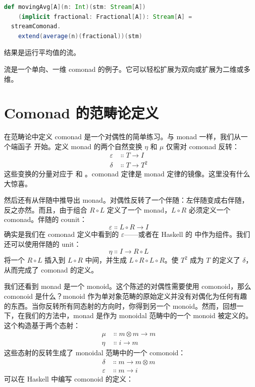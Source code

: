 \begin{lstlisting}[language=Scala]
def movingAvg[A](n: Int)(stm: Stream[A])
    (implicit fractional: Fractional[A]): Stream[A] =
  streamComonad.
    extend(average(n)(fractional))(stm)
\end{lstlisting}
结果是运行平均值的流。

流是一个单向、一维 comonad 的例子。它可以轻松扩展为双向或扩展为二维或多维。

\section{Comonad 的范畴论定义}

在范畴论中定义 comonad 是一个对偶性的简单练习。与 monad 一样，我们从一个端函子  开始。定义 monad 的两个自然变换 $\eta$ 和 $\mu$ 仅需对 comonad 反转：
\begin{align*}
  \varepsilon & \Colon T \to I   \\
  \delta      & \Colon T \to T^2
\end{align*}
这些变换的分量对应于  和 。comonad 定律是 monad 定律的镜像。这里没有什么大惊喜。

然后还有从伴随中推导出 monad。对偶性反转了一个伴随：左伴随变成右伴随，反之亦然。而且，由于组合 $R \circ L$ 定义了一个 monad，$L \circ R$ 必须定义一个 comonad。伴随的 counit：
\[\varepsilon \Colon L \circ R \to I\]
确实是我们在 comonad 定义中看到的 $\varepsilon$——或者在 Haskell 的  中作为组件。我们还可以使用伴随的 unit：
\[\eta \Colon I \to R \circ L\]
将一个 $R \circ L$ 插入到 $L \circ R$ 中间，并生成 $L \circ R \circ L \circ R$。使 $T^2$ 成为 $T$ 的定义了 $\delta$，从而完成了 comonad 的定义。

我们还看到 monad 是一个 monoid。这个陈述的对偶性需要使用 comonoid，那么 comonoid 是什么？monoid 作为单对象范畴的原始定义并没有对偶化为任何有趣的东西。当你反转所有同态射的方向时，你得到另一个 monoid。然而，回想一下，在我们的方法中，monad 是作为 monoidal 范畴中的一个 monoid 被定义的。这个构造基于两个态射：
\begin{align*}
  \mu  & \Colon m \otimes m \to m \\
  \eta & \Colon i \to m
\end{align*}
这些态射的反转生成了 monoidal 范畴中的一个 comonoid：
\begin{align*}
  \delta      & \Colon m \to m \otimes m \\
  \varepsilon & \Colon m \to i
\end{align*}
可以在 Haskell 中编写 comonoid 的定义：

